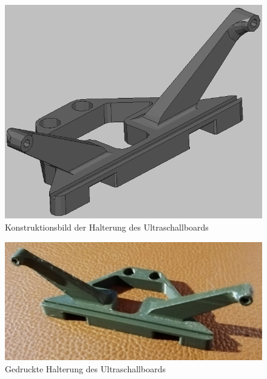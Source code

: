 \begin{minipage}[b]{0.4\textwidth}
\centering
\begin{figure}[H] %
\includegraphics[width=.9\textwidth]{sec2/images/3DAnbaukomponenten/Konstruktionsbilder/UltraschallHalterungKonstruktion} 
\centering
\captionsetup{width=.95\textwidth}
\caption[Konstruktionsbild der Halterung des Ultraschallboards]{Konstruktionsbild der Halterung des Ultraschallboards}\centering
\label{fig:UltraschallHalterungKonstruktion}
\end{figure}
\end{minipage}
\begin{minipage}[b]{0.54\textwidth}
\begin{figure}[H] %
\includegraphics[width=.9\textwidth]{sec2/images/3DAnbaukomponenten/Druckbilder/UltraschallHalterungDruck} 
\centering
\captionsetup{width=.95\textwidth}
\caption[Gedruckte Halterung des Ultraschallboards]{Gedruckte Halterung des Ultraschallboards}\centering
\label{fig:UltraschallHalterungDruck}
\end{figure}
\end{minipage}
\vspace{4mm}


